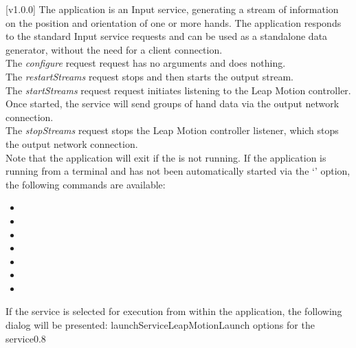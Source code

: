 [v1.0.0]
The  application is an Input service,
generating a stream of information on the position and orientation of one or more hands.
The application responds to the standard Input service requests and can be used as a
standalone data generator, without the need for a client connection.\\

The \emph{configure} request request has no arguments and does nothing.\\

The \emph{restartStreams} request stops and then starts the output stream.\\

The \emph{startStreams} request request initiates listening to the Leap Motion controller.
Once started, the service will send groups of hand data via the output \yarp{} network
connection.\\

The \emph{stopStreams} request stops the Leap Motion controller listener, which stops the
output \yarp{} network connection.\\ 

Note that the application will exit if the \emph{\RS} is not running.
\insertAppParameters
\insertTagDescription{\LMI}
\insertInputServiceComment
\condPage{}
If the application is running from a terminal and has not been automatically started via
the `' option, the following commands are available:
\begin{itemize}
\item{}
\item\exSp{}
\item\exSp{}
\item\exSp{}
\item\exSp{}
\item\exSp{}
\item\exSp{}
\end{itemize}
\secondaryEnd
\condPage
{}
If the service is selected for execution from within the \emph{\MMMU} application, the
following dialog will be presented:
%
{launchServiceLeapMotion}{Launch options for the \emph{\LMI} service}{0.8}

